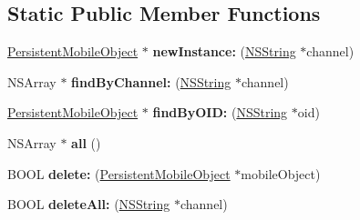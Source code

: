 \subsection*{\-Static \-Public \-Member \-Functions}
\begin{DoxyCompactItemize}
\item 
\hypertarget{interface_persistent_mobile_object_afadae5d933027b94bd6a38aa96e4c412}{
\hyperlink{interface_persistent_mobile_object}{\-Persistent\-Mobile\-Object} $\ast$ {\bfseries new\-Instance\-:} (\hyperlink{class_n_s_string}{\-N\-S\-String} $\ast$channel)}
\label{interface_persistent_mobile_object_afadae5d933027b94bd6a38aa96e4c412}

\item 
\hypertarget{interface_persistent_mobile_object_a23e6a6e92e496fb23b7fdd5fd4c68f62}{
\-N\-S\-Array $\ast$ {\bfseries find\-By\-Channel\-:} (\hyperlink{class_n_s_string}{\-N\-S\-String} $\ast$channel)}
\label{interface_persistent_mobile_object_a23e6a6e92e496fb23b7fdd5fd4c68f62}

\item 
\hypertarget{interface_persistent_mobile_object_abaa5de2bf0ecd420000d4579621ee671}{
\hyperlink{interface_persistent_mobile_object}{\-Persistent\-Mobile\-Object} $\ast$ {\bfseries find\-By\-O\-I\-D\-:} (\hyperlink{class_n_s_string}{\-N\-S\-String} $\ast$oid)}
\label{interface_persistent_mobile_object_abaa5de2bf0ecd420000d4579621ee671}

\item 
\hypertarget{interface_persistent_mobile_object_a8359cdf438bbf477ce0409e0fb0265b3}{
\-N\-S\-Array $\ast$ {\bfseries all} ()}
\label{interface_persistent_mobile_object_a8359cdf438bbf477ce0409e0fb0265b3}

\item 
\hypertarget{interface_persistent_mobile_object_a2d1750b3c5f21f200106b653f203fc65}{
\-B\-O\-O\-L {\bfseries delete\-:} (\hyperlink{interface_persistent_mobile_object}{\-Persistent\-Mobile\-Object} $\ast$mobile\-Object)}
\label{interface_persistent_mobile_object_a2d1750b3c5f21f200106b653f203fc65}

\item 
\hypertarget{interface_persistent_mobile_object_a014364a8615fd8e40062c6a57fa147a7}{
\-B\-O\-O\-L {\bfseries delete\-All\-:} (\hyperlink{class_n_s_string}{\-N\-S\-String} $\ast$channel)}
\label{interface_persistent_mobile_object_a014364a8615fd8e40062c6a57fa147a7}

\end{DoxyCompactItemize}
